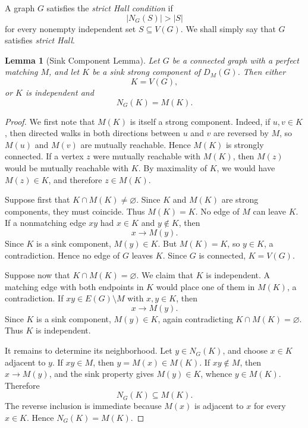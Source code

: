 \documentclass[preprint,12pt]{elsarticle}
\theoremstyle{plain}
\newtheorem{lemma}[theorem]{Lemma}
\begin{document}
A graph \(G\) satisfies the \emph{strict Hall condition} if
\begin{equation}\label{eq_strict_hall}
 |N_G(S)|>|S|
\end{equation}
for every nonempty independent set \(S\subseteq V(G)\). We shall simply
say that \(G\) satisfies \emph{strict Hall}.

\begin{lemma}[Sink Component Lemma]\label{lem_sink_component}
Let \(G\) be a connected graph with a perfect matching \(M\), and let
\(K\) be a sink strong component of \(D_M(G)\). Then either
\[
K=V(G),
\]
or \(K\) is independent and
\[
N_G(K)=M(K).
\]
\end{lemma}

\begin{proof}
We first note that \(M(K)\) is itself a strong component. Indeed, if
\(u,v\in K\), then directed walks in both directions between \(u\) and
\(v\) are reversed by \(M\), so \(M(u)\) and \(M(v)\) are mutually
reachable. Hence \(M(K)\) is strongly connected. If a vertex \(z\) were
mutually reachable with \(M(K)\), then \(M(z)\) would be mutually
reachable with \(K\). By maximality of \(K\), we would have \(M(z)\in K\),
and therefore \(z\in M(K)\).

Suppose first that \(K\cap M(K)\neq\varnothing\). Since \(K\) and
\(M(K)\) are strong components, they must coincide. Thus \(M(K)=K\).
No edge of \(M\) can leave \(K\). If a nonmatching edge \(xy\) had
\(x\in K\) and \(y\notin K\), then
\[
x\longrightarrow M(y).
\]
Since \(K\) is a sink component, \(M(y)\in K\). But \(M(K)=K\), so
\(y\in K\), a contradiction. Hence no edge of \(G\) leaves \(K\).
Since \(G\) is connected, \(K=V(G)\).

Suppose now that \(K\cap M(K)=\varnothing\). We claim that \(K\) is
independent. A matching edge with both endpoints in \(K\) would place one
of them in \(M(K)\), a contradiction. If \(xy\in E(G)\setminus M\) with
\(x,y\in K\), then
\[
x\longrightarrow M(y).
\]
Since \(K\) is a sink component, \(M(y)\in K\), again contradicting
\(K\cap M(K)=\varnothing\). Thus \(K\) is independent.

It remains to determine its neighborhood. Let \(y\in N_G(K)\), and choose
\(x\in K\) adjacent to \(y\). If \(xy\in M\), then \(y=M(x)\in M(K)\).
If \(xy\notin M\), then \(x\to M(y)\), and the sink property gives
\(M(y)\in K\), whence \(y\in M(K)\). Therefore
\[
N_G(K)\subseteq M(K).
\]
The reverse inclusion is immediate because \(M(x)\) is adjacent to \(x\)
for every \(x\in K\). Hence \(N_G(K)=M(K)\).
\end{proof}
\end{document}
